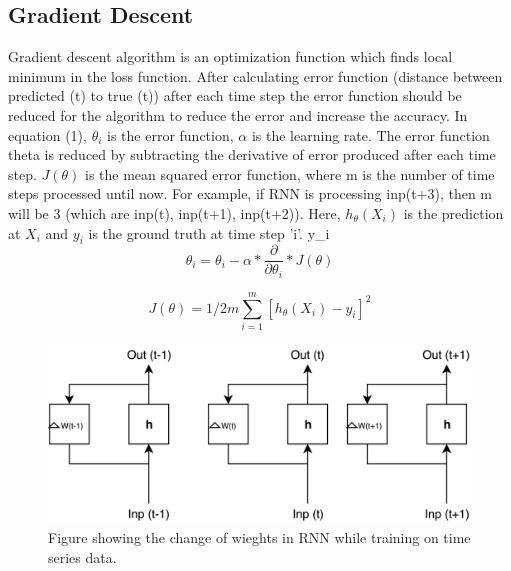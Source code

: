 \documentclass[sigconf,authordraft]{acmart}
\begin{document}
\subsection{Gradient Descent}

Gradient descent algorithm is an optimization function which finds local minimum in the loss function. After calculating error function (distance between predicted (t) to true (t)) after each time step the error function should be reduced for the algorithm to reduce the error and increase the accuracy. In equation (1), \begin{math}\theta_i\end{math} is the error function, \begin{math}\alpha\end{math} is the learning rate. The error function theta is reduced by subtracting the derivative of error produced after each time step. \begin{math}J(\theta) \end{math} is the mean squared error function, where m is the number of time steps processed until now. For example, if RNN is processing inp(t+3), then m will be 3 (which are inp(t), inp(t+1), inp(t+2)). Here, \begin{math}h_\theta(X_i)\end{math} is the prediction at \begin{math}
 X_i\end{math} and \begin{math} y_i \end{math}  is the ground truth at time step 'i'.
y\_i
\begin{equation}
  \theta_i = \theta_i - \alpha*\frac{\partial}{\partial \theta_i}*J(\theta)
\end{equation}

\begin{equation}
J(\theta) = 1/2m \sum_{i=1}^{m} [h_\theta(X_i) - y_i]^2
\end{equation}


\begin{figure}
\includegraphics[width=\linewidth, scale = 0.5]{RNN_background.png}
\caption{Figure showing the change of wieghts in RNN while training on time series data.} \label{fig:1}
\end{figure}
\end{document}
